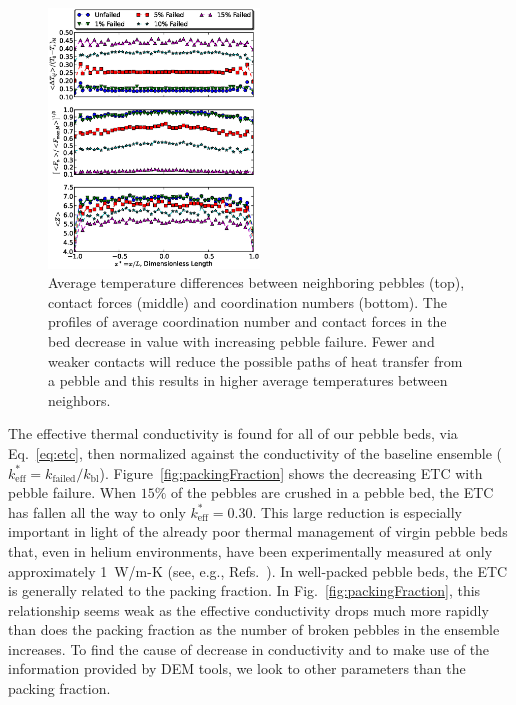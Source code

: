 \begin{figure}[t]
	\centering
	\includegraphics[width=0.5\textwidth]{chapters/figures/z_f_deltaT_subPlots}
	\caption{Average temperature differences between neighboring pebbles (top), contact forces (middle) and coordination numbers (bottom). The profiles of average coordination number and contact forces in the bed decrease in value with increasing pebble failure. Fewer and weaker contacts will reduce the possible paths of heat transfer from a pebble and this results in higher average temperatures between neighbors.}
\label{fig:coordProfiles}
\end{figure}


The effective thermal conductivity is found for all of our pebble beds, via Eq.~\ref{eq:etc}, then normalized against the conductivity of the baseline ensemble ($k_\text{eff}^* = k_\text{failed}/k_\text{bl}$). Figure~\ref{fig:packingFraction} shows the decreasing ETC with pebble failure. When $15\%$ of the pebbles are crushed in a pebble bed, the ETC has fallen all the way to only $k_\text{eff}^*=0.30$. This large reduction is especially important in light of the already poor thermal management of virgin pebble beds that, even in helium environments, have been experimentally measured at only approximately 1~W/m-K (see, { e.g.}, Refs.~\cite{Reimann:2002mi, Piazza2002}). In well-packed pebble beds, the ETC is generally related to the packing fraction. In Fig.~\ref{fig:packingFraction}, this relationship seems weak as the effective conductivity drops much more rapidly than does the packing fraction as the number of broken pebbles in the ensemble increases. To find the cause of decrease in conductivity and to make use of the information provided by DEM tools, we look to other parameters than the packing fraction.

